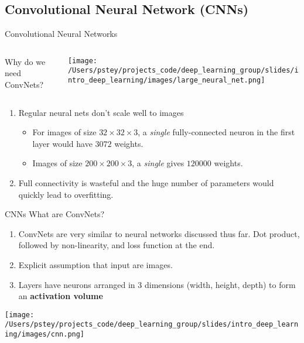 \documentclass[pdf]{beamer}
\begin{document}
	\subsection{Convolutional Neural Network (CNNs)}
	\begin{frame}{Convolutional Neural Networks}
	\begin{columns}
	\begin{column}{0.5\textwidth}
	\vspace{3em}
	
	Why do we need ConvNets?
	\end{column}

	\begin{column}{0.5\textwidth}
	\begin{center}
		\texttt{[image: /Users/pstey/projects\_code/deep\_learning\_group/slides/intro\_deep\_learning/images/large\_neural\_net.png]}
		
	\end{center}
	
	\end{column}
	\end{columns}
	
	\begin{enumerate}
		\item Regular neural nets don't scale well to images
			\begin{itemize}
				\item For images of size $32 \times 32 \times 3$, a \textit{single} fully-connected neuron in the first layer would have $3072$ weights.
				\item Images of size $200 \times 200 \times 3$, a \textit{single} gives $120000$ weights.

			\end{itemize}
		\item Full connectivity is wasteful and the huge number of parameters would quickly lead to overfitting.
		
	\end{enumerate}
	\end{frame}




	\begin{frame}{CNNs}
	What are ConvNets?
	\vspace{1em}
	
	\begin{enumerate}
		\item ConvNets are very similar to neural networks discussed thus far. Dot product, followed by non-linearity, and loss function at the end.
		\item Explicit assumption that input are images.
		\item Layers have neurons arranged in 3 dimensions (width, height, depth) to form an \textbf{activation volume}
	\end{enumerate}
	
	\begin{center}
	\texttt{[image: /Users/pstey/projects\_code/deep\_learning\_group/slides/intro\_deep\_learning/images/cnn.png]}
	
	\end{center}
	\end{frame}
\end{document}

